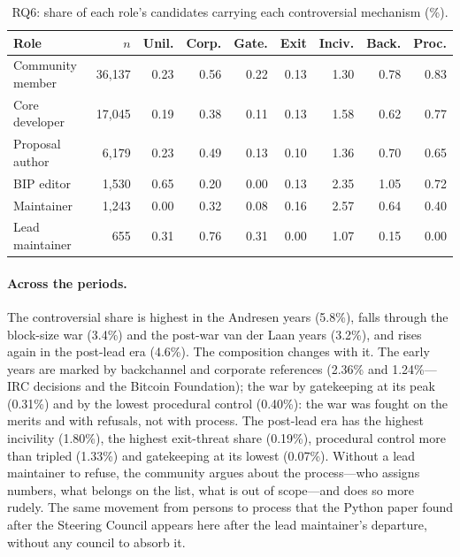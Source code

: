 \documentclass[sigconf,screen]{acmart}
\begin{document}
\begin{table}[t]
\caption{RQ6: share of each role's candidates carrying each controversial mechanism (\%).}
\label{tab:rq6roles}
\footnotesize
\setlength{\tabcolsep}{3pt}
\begin{tabular}{lrrrrrrrr}
\toprule
Role & $n$ & Unil. & Corp. & Gate. & Exit & Inciv. & Back. & Proc. \\
\midrule
Community member & 36,137 & 0.23 & 0.56 & 0.22 & 0.13 & 1.30 & 0.78 & 0.83 \\
Core developer & 17,045 & 0.19 & 0.38 & 0.11 & 0.13 & 1.58 & 0.62 & 0.77 \\
Proposal author & 6,179 & 0.23 & 0.49 & 0.13 & 0.10 & 1.36 & 0.70 & 0.65 \\
BIP editor & 1,530 & 0.65 & 0.20 & 0.00 & 0.13 & 2.35 & 1.05 & 0.72 \\
Maintainer & 1,243 & 0.00 & 0.32 & 0.08 & 0.16 & 2.57 & 0.64 & 0.40 \\
Lead maintainer & 655 & 0.31 & 0.76 & 0.31 & 0.00 & 1.07 & 0.15 & 0.00 \\
\bottomrule
\end{tabular}
\end{table}

\paragraph{Across the periods.} The controversial share is highest in the Andresen years (5.8\%), falls through the block-size war (3.4\%) and the post-war van der Laan years (3.2\%), and rises again in the post-lead era (4.6\%). The composition changes with it. The early years are marked by backchannel and corporate references (2.36\% and 1.24\%---IRC decisions and the Bitcoin Foundation); the war by gatekeeping at its peak (0.31\%) and by the lowest procedural control (0.40\%): the war was fought on the merits and with refusals, not with process. The post-lead era has the highest incivility (1.80\%), the highest exit-threat share (0.19\%), procedural control more than tripled (1.33\%) and gatekeeping at its lowest (0.07\%). Without a lead maintainer to refuse, the community argues about the process---who assigns numbers, what belongs on the list, what is out of scope---and does so more rudely. The same movement from persons to process that the Python paper found after the Steering Council appears here after the lead maintainer's departure, without any council to absorb it.
\end{document}
